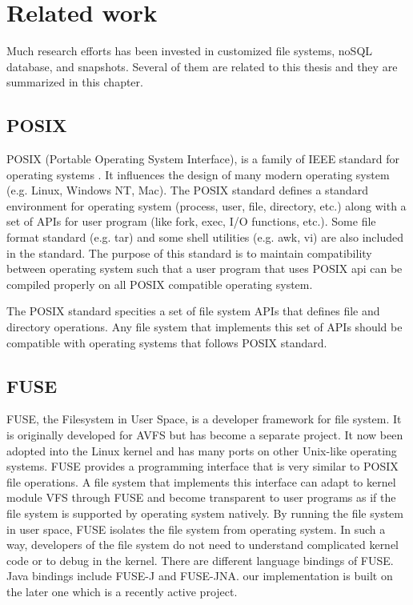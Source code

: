 \chapter{Related work}
\label{chap:related_work}

    Much research efforts has been invested in customized file systems, noSQL database, and snapshots. Several of them are related to this thesis and they are summarized in this chapter.

\section{POSIX}

    POSIX (Portable Operating System Interface), is a family of IEEE standard for operating systems \cite{posix_wiki}. It influences the design of many modern operating system (e.g. Linux, Windows NT, Mac). The POSIX standard defines a standard environment for operating system (process, user, file, directory, etc.) along with a set of APIs for user program (like fork, exec, I/O functions, etc.)\cite{posix}. Some file format standard (e.g. tar) and some shell utilities (e.g. awk, vi) are also included in the standard. The purpose of this standard is to maintain compatibility between operating system such that a user program that uses POSIX api can be compiled properly on all POSIX compatible operating system.

    The POSIX standard specities a set of file system APIs that defines file and directory operations. Any file system that implements this set of APIs should be compatible with operating systems that follows POSIX standard.

\section{FUSE}

    FUSE, the Filesystem in User Space, is a developer framework for file system. It is originally developed for AVFS but has become a separate project. It now been adopted into the Linux kernel and has many ports on other Unix-like operating systems. FUSE provides a programming interface that is very similar to POSIX file operations. A file system that implements this interface can adapt to kernel module VFS through FUSE and become transparent to user programs as if the file system is supported by operating system natively. By running the file system in user space, FUSE isolates the file system from operating system. In such a way, developers of the file system do not need to understand complicated kernel code or to debug in the kernel. 
    There are different language bindings of FUSE. Java bindings include FUSE-J and FUSE-JNA. our implementation is built on the later one which is a recently active project.

